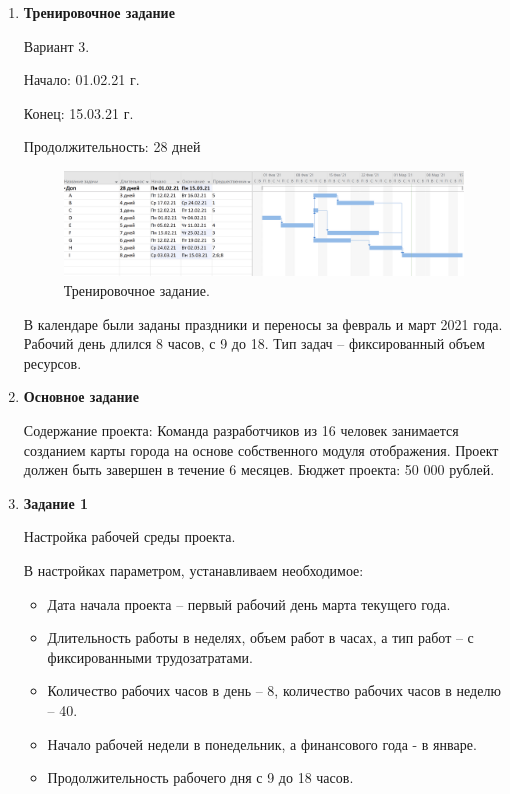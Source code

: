 \documentclass[a4paper,14pt]{extreport} %
\begin{document}
\begin{enumerate}
\item \textbf{Тренировочное задание}

Вариант 3.

Начало: 01.02.21 г.

Конец: 15.03.21 г. 

Продолжительность: 28 дней

\begin{figure}[H]
  \centering
  \caption{Тренировочное задание. }
  \includegraphics[scale=0.48]{dop}
\end{figure}

В календаре были заданы праздники и переносы за февраль и март 2021 года. Рабочий день длился 8 часов, с 9 до 18.
Тип задач -- фиксированный объем ресурсов.

\item \textbf{Основное задание}

Содержание проекта: Команда разработчиков из 16 человек занимается созданием карты города на основе собственного модуля отображения. Проект должен быть завершен в течение 6 месяцев. Бюджет проекта: 50 000 рублей.

\item \textbf{Задание 1}

Настройка рабочей среды проекта.

В настройках параметром, устанавливаем необходимое:
\begin{itemize}
\item Дата начала проекта – первый рабочий день марта текущего года.
\item Длительность работы в неделях, объем работ в часах, а тип работ -- с фиксированными трудозатратами.
\item Количество рабочих часов в день -- 8, количество рабочих часов в неделю -- 40.
\item Начало рабочей недели в понедельник, а финансового года - в январе.
\item Продолжительность рабочего дня с 9 до 18 часов.
\end{itemize}


\end{enumerate}
\end{document}
